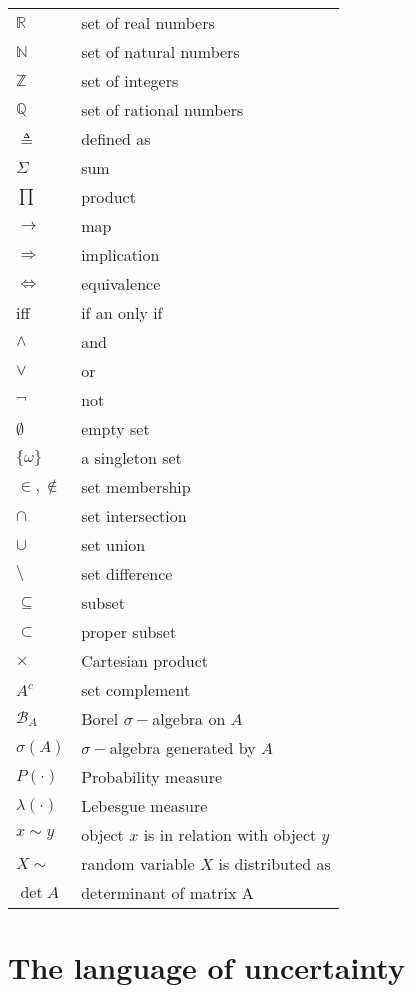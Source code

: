 \documentclass{book}
\theoremstyle{plain}%
\theoremstyle{definition}
\newlength{\arrow}
\begin{document}
\begin{tabular}{ll}
$\mathbb{R}$ & set of real numbers \\
$\mathbb{N}$ & set of natural numbers \\
$\mathbb{Z}$ & set of integers \\
$\mathbb{Q}$ & set of rational numbers \\
$\triangleq$ & defined as \\
$\Sigma$ & sum \\
$\prod$ & product \\
$\longrightarrow$ & map \\
$\Longrightarrow$ & implication \\
$\Longleftrightarrow$ & equivalence \\
iff & if an only if \\
$\wedge$ & and \\
$\vee$ & or \\
$\lnot$ & not \\
$\emptyset$ & empty set \\
$\{\omega\}$ & a singleton set \\
$\in, \notin$ & set membership \\
$\cap$ & set intersection \\
$\cup$ & set union \\
$\setminus$ & set difference \\
$\subseteq$ & subset \\
$\subset$ & proper subset \\
$\times$ & Cartesian product \\
$A^c$ & set complement \\
$\mathcal{B}_A$ & Borel $\sigma-$algebra on $A$ \\
$\sigma(A)$ & $\sigma-$algebra generated by $A$ \\
$P(\cdot)$ & Probability measure \\
$\lambda(\cdot)$ & Lebesgue measure \\
$x \sim y$ & object $x$ is in relation with object $y$ \\
$X \sim $ & random variable $X$ is distributed as \\
$\det A$ & determinant of matrix A \\
\end{tabular}

\part{The language of uncertainty}
\end{document}
